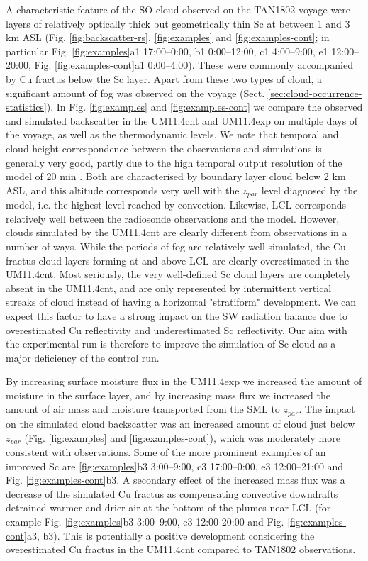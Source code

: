 A characteristic feature of the SO cloud observed on the TAN1802 voyage
were layers of relatively optically thick but geometrically thin Sc
at between 1 and 3 km ASL (Fig. \ref{fig:backscatter-rs}, \ref{fig:examples}
and
\ref{fig:examples-cont}; in particular Fig. \ref{fig:examples}a1 17:00--0:00, b1 0:00--12:00, c1
4:00--9:00, e1 12:00--20:00, Fig. \ref{fig:examples-cont}a1 0:00--4:00).
These were commonly accompanied by Cu fractus
below the Sc layer. Apart from these two types of cloud, a significant amount
of fog was observed on the voyage (Sect. \ref{sec:cloud-occurrence-statistics}).
In Fig. \ref{fig:examples} and \ref{fig:examples-cont} we compare the
observed and simulated backscatter in the UM11.4cnt and UM11.4exp on
multiple days of the voyage, as well as the thermodynamic levels. We note that
temporal and cloud height correspondence between the observations and simulations
is generally very good, partly due to the high temporal output resolution of
the model of 20 min \citep{kuma2020}. Both are characterised by boundary
layer cloud below 2 km ASL, and this altitude corresponds very well with
the $z_{par}$ level diagnosed by the model, i.e. the highest level reached
by convection. Likewise, LCL corresponds relatively well between the
radiosonde observations and the model. However, clouds simulated by the
UM11.4cnt are clearly different from observations in a number of ways.
While the periods of fog are relatively well simulated, the Cu fractus
cloud layers forming at and above LCL are clearly overestimated in the
UM11.4cnt. Most seriously, the very well-defined Sc cloud layers are
completely absent in the UM11.4cnt, and are only represented by
intermittent vertical streaks of cloud instead of having a horizontal 
"stratiform" development. We can expect this factor to have a strong
impact on the SW radiation balance due to overestimated Cu reflectivity
and underestimated Sc reflectivity. Our aim with the experimental run is
therefore to improve
the simulation of Sc cloud as a major deficiency of the control run.

By increasing surface moisture flux in the UM11.4exp we increased
the amount of moisture in the surface layer, and by increasing mass
flux we increased the amount of air mass and moisture transported
from the SML to $z_{par}$. The impact on the simulated
cloud backscatter was an increased amount of cloud just below $z_{par}$ (Fig.
\ref{fig:examples} and \ref{fig:examples-cont}),
which was moderately more consistent with observations. Some of the more
prominent examples of an improved Sc are \ref{fig:examples}b3 3:00--9:00, c3 17:00--0:00,
e3 12:00--21:00 and Fig. \ref{fig:examples-cont}b3. A secondary effect
of the increased mass flux was a decrease of the simulated Cu fractus as
compensating convective downdrafts detrained warmer and drier air at the bottom
of the plumes near LCL (for example Fig. \ref{fig:examples}b3 3:00--9:00, e3 12:00-20:00
and Fig. \ref{fig:examples-cont}a3, b3). This is potentially a positive
development considering the overestimated Cu fractus in the UM11.4cnt compared
to TAN1802 observations.

